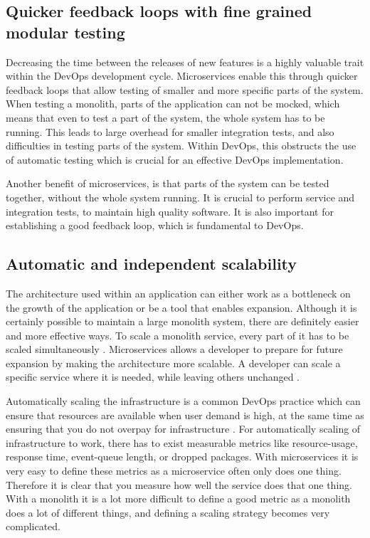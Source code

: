 \documentclass[a4paper]{article}
\begin{document}
\subsection{Quicker feedback loops with fine grained modular testing}
Decreasing the time between the releases of new features is a highly valuable trait within the DevOps development cycle. Microservices enable this through quicker feedback loops that allow testing of smaller and more specific parts of the system. When testing a monolith, parts of the application can not be mocked, which means that even to test a part of the system, the whole system has to be running. This leads to large overhead for smaller integration tests, and also difficulties in testing parts of the system. Within DevOps, this obstructs the use of automatic testing which is crucial for an effective DevOps implementation. 

Another benefit of microservices, is that parts of the system can be tested together, without the whole system running. It is crucial to perform service and integration tests, to maintain high quality software. It is also important for establishing a good feedback loop, which is fundamental to DevOps.

\subsection{Automatic and independent scalability}
The architecture used within an application can either work as a bottleneck on the growth of the application or be a tool that enables expansion. Although it is certainly possible to maintain a large monolith system, there are definitely easier and more effective ways. To scale a monolith service, every part of it has to be scaled simultaneously \cite{Newman2015}. Microservices allows a developer to prepare for future expansion by making the architecture more scalable. A developer can scale a specific service where it is needed, while leaving others unchanged \cite{Newman2015}.

Automatically scaling the infrastructure is a common DevOps practice which can ensure that resources are available when user demand is high, at the same time as ensuring that you do not overpay for infrastructure \cite{Pinedo2015}. For automatically scaling of infrastructure to work, there has to exist measurable metrics like resource-usage, response time, event-queue length, or dropped packages. With microservices it is very easy to define these metrics as a microservice often only does one thing. Therefore it is clear that you measure how well the service does that one thing. With a monolith it is a lot more difficult to define a good metric as a monolith does a lot of different things, and defining a scaling strategy becomes very complicated.
\end{document}
